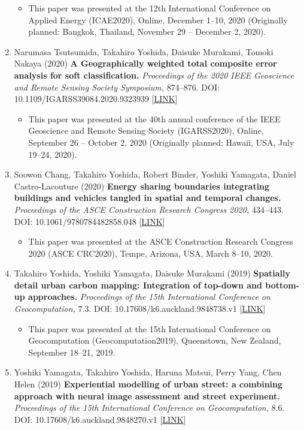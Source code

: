 \documentclass[
]{book}
\providecommand{\tightlist}{%
  \setlength{\itemsep}{0pt}\setlength{\parskip}{0pt}}
\begin{document}
\begin{enumerate}
  \begin{itemize}
  \tightlist
  \item
    This paper was presented at the 12th International Conference on Applied Energy (ICAE2020), Online, December 1--10, 2020 (Originally planned: Bangkok, Thailand, November 29 -- December 2, 2020).
  \end{itemize}
\item
  Narumasa Tsutsumida, Takahiro Yoshida, Daisuke Murakami, Tomoki Nakaya (2020)
  \textbf{A Geographically weighted total composite error analysis for soft classification.}
  \emph{Proceedings of the 2020 IEEE Geoscience and Remote Sensing Society Symposium,} 874--876.
  DOI: 10.1109/IGARSS39084.2020.9323939 {[}\href{https://ieeexplore.ieee.org/document/9323939}{LINK}{]}

  \begin{itemize}
  \tightlist
  \item
    This paper was presented at the 40th annual conference of the IEEE Geoscience and Remote Sensing Society (IGARSS2020), Online, September 26 -- October 2, 2020 (Originally planned: Hawaii, USA, July 19--24, 2020).
  \end{itemize}
\item
  Soowon Chang, Takahiro Yoshida, Robert Binder, Yoshiki Yamagata, Daniel Castro-Lacouture (2020)
  \textbf{Energy sharing boundaries integrating buildings and vehicles tangled in spatial and temporal changes.}
  \emph{Proceedings of the ASCE Construction Research Congress 2020,} 434--443.
  DOI: 10.1061/9780784482858.048 {[}\href{https://ascelibrary.org/doi/10.1061/9780784482858.048}{LINK}{]}

  \begin{itemize}
  \tightlist
  \item
    This paper was presented at the ASCE Construction Research Congress 2020 (ASCE CRC2020), Tempe, Arizona, USA, March 8--10, 2020.
  \end{itemize}
\item
  Takahiro Yoshida, Yoshiki Yamagata, Daisuke Murakami (2019)
  \textbf{Spatially detail urban carbon mapping: Integration of top-down and bottom-up approaches.}
  \emph{Proceedings of the 15th International Conference on Geocomputation,} 7.3.
  DOI: 10.17608/k6.auckland.9848738.v1 {[}\href{https://doi.org/10.17608/k6.auckland.9848738.v1}{LINK}{]}

  \begin{itemize}
  \tightlist
  \item
    This paper was presented at the 15th International Conference on Geocomputation (Geocomputation2019), Queenstown, New Zealand, September 18--21, 2019.
  \end{itemize}
\item
  Yoshiki Yamagata, Takahiro Yoshida, Haruna Matsui, Perry Yang, Chen Helen (2019)
  \textbf{Experiential modelling of urban street: a combining approach with neural image assessment and street experiment.}
  \emph{Proceedings of the 15th International Conference on Geocomputation,} 8.6.
  DOI: 10.17608/k6.auckland.9848270.v1 {[}\href{https://doi.org/10.17608/k6.auckland.9848270.v1}{LINK}{]}


\end{enumerate}
\end{document}
